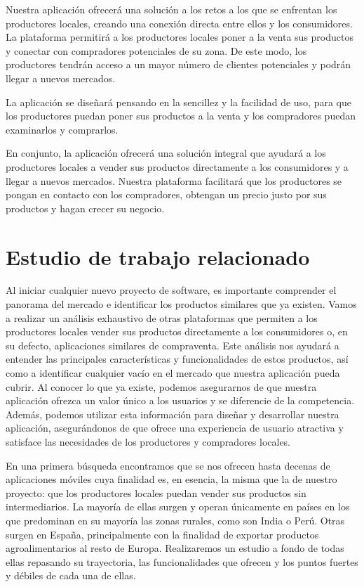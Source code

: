 Nuestra aplicación ofrecerá una solución a los retos a los que se enfrentan los productores locales, creando una conexión directa entre ellos y los consumidores. La plataforma permitirá a los productores locales poner a la venta sus productos y conectar con compradores potenciales de su zona. De este modo, los productores tendrán acceso a un mayor número de clientes potenciales y podrán llegar a nuevos mercados.

La aplicación se diseñará pensando en la sencillez y la facilidad de uso, para que los productores puedan poner sus productos a la venta y los compradores puedan examinarlos y comprarlos.

En conjunto, la aplicación ofrecerá una solución integral que ayudará a los productores locales a vender sus productos directamente a los consumidores y a llegar a nuevos mercados. Nuestra plataforma facilitará que los productores se pongan en contacto con los compradores, obtengan un precio justo por sus productos y hagan crecer su negocio.

\section{Estudio de trabajo relacionado}\label{sec:estudio_trabajo_relacionado}

Al iniciar cualquier nuevo proyecto de software, es importante comprender el panorama del mercado e identificar los productos similares que ya existen. Vamos a realizar un análisis exhaustivo de otras plataformas que permiten a los productores locales vender sus productos directamente a los consumidores o, en su defecto, aplicaciones similares de compraventa. Este análisis nos ayudará a entender las principales características y funcionalidades de estos productos, así como a identificar cualquier vacío en el mercado que nuestra aplicación pueda cubrir. Al conocer lo que ya existe, podemos asegurarnos de que nuestra aplicación ofrezca un valor único a los usuarios y se diferencie de la competencia. Además, podemos utilizar esta información para diseñar y desarrollar nuestra aplicación, asegurándonos de que ofrece una experiencia de usuario atractiva y satisface las necesidades de los productores y compradores locales.

En una primera búsqueda encontramos que se nos ofrecen hasta decenas de aplicaciones móviles cuya finalidad es, en esencia, la misma que la de nuestro proyecto: que los productores locales puedan vender sus productos sin intermediarios. La mayoría de ellas surgen y operan únicamente en países en los que predominan en su mayoría las zonas rurales, como son India o Perú. Otras surgen en España, principalmente con la finalidad de exportar productos agroalimentarios al resto de Europa. Realizaremos un estudio a fondo de todas ellas repasando su trayectoria, las funcionalidades que ofrecen y los puntos fuertes y débiles de cada una de ellas.


